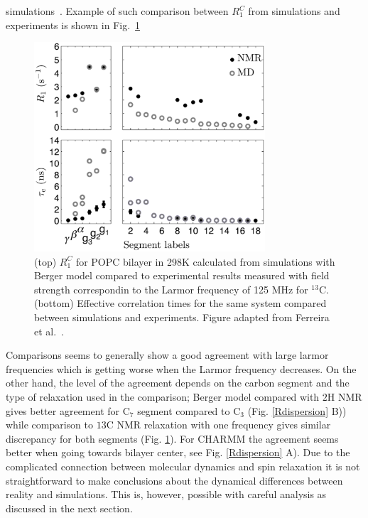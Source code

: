 \documentclass[aps,prl,superscriptaddress,twocolumn]{revtex4}
\begin{document}
simulations~\cite{feller02,eldho03,ollila07a,klauda08b,klauda12,ferreira15}. Example of such comparison between $R_1^{C}$ from simulations and experiments is shown in Fig.~\ref{RandEFFCT}
\begin{figure}[]
  \includegraphics[width=8.6cm]{../Fig/RandEFFCT.eps}
\newline
  \caption{\label{RandEFFCT}
    (top)  $R_1^{C}$ for POPC bilayer in 298K calculated from simulations with Berger model compared to experimental results measured 
    with field strength correspondin to the Larmor frequency of 125 MHz for $^{13}$C.
    (bottom) Effective correlation times for the same system compared between simulations and experiments. 
    Figure adapted from Ferreira et al.~\cite{ferreira15}.
  } 
\end{figure}
Comparisons seems to generally show a good agreement with large larmor frequencies which
is getting worse when the Larmor frequency decreases. On the other hand, the level of the 
agreement depends on the carbon segment and the type of relaxation used in the comparison;
Berger model compared with $2$H NMR gives better agreement for C$_7$ segment compared to
C$_3$ (Fig. \ref{Rdispersion} B)) while comparison to $ 13$C NMR relaxation with one frequency 
gives similar discrepancy for both segments (Fig. \ref{RandEFFCT}). For CHARMM the agreement
seems better when going towards bilayer center, see Fig. \ref{Rdispersion} A).
Due to the complicated connection between molecular dynamics and spin relaxation it
is not straightforward to make conclusions about the dynamical differences between reality
and simulations. This is, however, possible with careful analysis as discussed in the next section.
\end{document}
